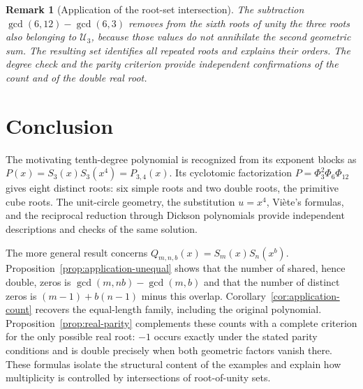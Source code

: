 \documentclass[11pt,a4paper]{article}
\numberwithin{equation}{section}
\theoremstyle{uprightpaper}
\newtheorem{remark}{Remark}[section]
\begin{document}
\begin{remark}[Application of the root-set intersection]\label{rem:exercise-four}
The subtraction $\gcd(6,12)-\gcd(6,3)$ removes from the sixth roots of unity the three roots also belonging to $\mathcal U_3$, because those values do not annihilate the second geometric sum. The resulting set identifies all repeated roots and explains their orders. The degree check and the parity criterion provide independent confirmations of the count and of the double real root.
\end{remark}

\section{Conclusion}\label{sec:conclusion}

The motivating tenth-degree polynomial is recognized from its exponent blocks as $P(x)=S_3(x)S_3(x^4)=P_{3,4}(x)$. Its cyclotomic factorization $P=\Phi_3^2\Phi_6\Phi_{12}$ gives eight distinct roots: six simple roots and two double roots, the primitive cube roots. The unit-circle geometry, the substitution $u=x^4$, Vi\`ete's formulas, and the reciprocal reduction through Dickson polynomials provide independent descriptions and checks of the same solution.

The more general result concerns $Q_{m,n,b}(x)=S_m(x)S_n(x^b)$. Proposition~\ref{prop:application-unequal} shows that the number of shared, hence double, zeros is $\gcd(m,nb)-\gcd(m,b)$ and that the number of distinct zeros is $(m-1)+b(n-1)$ minus this overlap. Corollary~\ref{cor:application-count} recovers the equal-length family, including the original polynomial. Proposition~\ref{prop:real-parity} complements these counts with a complete criterion for the only possible real root: $-1$ occurs exactly under the stated parity conditions and is double precisely when both geometric factors vanish there. These formulas isolate the structural content of the examples and explain how multiplicity is controlled by intersections of root-of-unity sets.



\end{document}
